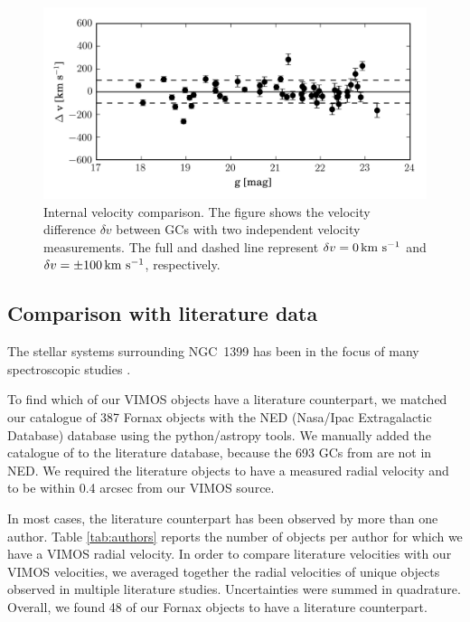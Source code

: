\documentclass[useAMS,usenatbib]{mn2e}
\newcommand{\kms}{\mbox{\,km~s$^{-1}$}}
\begin{document}
\begin{figure}
\centering
\includegraphics[width=\columnwidth]{figures/internal.png} 
\caption{Internal velocity comparison. The figure shows the velocity difference 
$\delta v$ between  GCs with two independent velocity measurements. The full 
and dashed line represent $\delta v = 0 \kms$ and $\delta v = \pm 100 \kms$, 
respectively. }
\label{fig:internal}
\end{figure}

\subsection{Comparison with literature data}

The stellar systems surrounding NGC~1399 has been in the focus of many 
spectroscopic studies
\citep{Dirsch04, Schuberth10, Bergond07, Firth07, Chilingarian11, Mieske04, 
Hilker07, Francis12, Drinkwater00}.

To find which of our VIMOS objects have a literature counterpart, we matched 
our catalogue of 387 Fornax objects with the NED (Nasa/Ipac Extragalactic 
Database) database using the python/astropy tools. 
We manually added the catalogue of \citet{Schuberth} to the literature 
database, because the 693 GCs from \citet{Schuberth} are not in NED. We 
required the literature objects to have a measured radial velocity and to be 
within 0.4 arcsec from our VIMOS source. 

In most cases, the literature counterpart has been observed by more than one 
author. Table \ref{tab:authors} reports the number of objects per author for 
which we have a VIMOS radial velocity. 
In order to compare literature velocities with our VIMOS velocities, we 
averaged together the radial velocities of unique objects observed in multiple 
literature studies. Uncertainties were summed in quadrature. Overall, we found 
48 of our Fornax objects to have a literature counterpart. 
\end{document}
